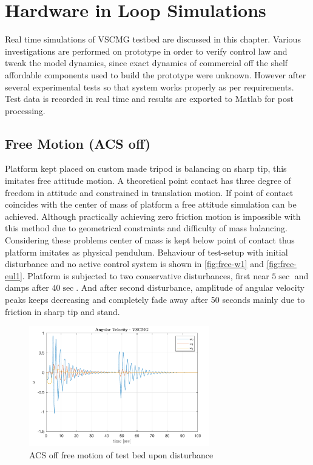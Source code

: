 \chapter{Hardware in Loop Simulations}
\label{chap:9}
Real time simulations of VSCMG testbed are discussed in this chapter. 
Various investigations are performed on prototype in order to verify control law and tweak the model dynamics, since exact dynamics of commercial off the shelf affordable components used to build the prototype were unknown. However after several experimental tests so that system works properly as per requirements. Test data is recorded in real time and results are exported to Matlab for post processing.
\section{Free Motion (ACS off)}
Platform kept placed on custom made tripod is balancing on sharp tip, this imitates free attitude motion. A theoretical point contact has three degree of freedom in attitude and constrained in translation motion. If point of contact coincides with the center of mass of platform a free attitude simulation can be achieved. Although practically achieving zero friction motion is impossible with this method due to geometrical constraints and difficulty of mass balancing. Considering these problems center of mass is kept below point of contact thus platform imitates as physical pendulum. Behaviour of test-setup with initial disturbance and no active control system is shown in \autoref{fig:free-w1} and \autoref{fig:free-eul1}. Platform is subjected to two conservative disturbances, first near $5 \sec$ and damps after $40 \sec$. And after second disturbance, amplitude of angular velocity peaks keeps decreasing and completely fade away after 50 seconds mainly due to friction in sharp tip and stand.


\begin{figure}[ht]
    \centering
    \includegraphics[width=0.7\textwidth]{figures/plots/exp/free-w1.pdf}
    \caption{ACS off free motion of test bed upon disturbance}
    \label{fig:free-w1}
\end{figure}

